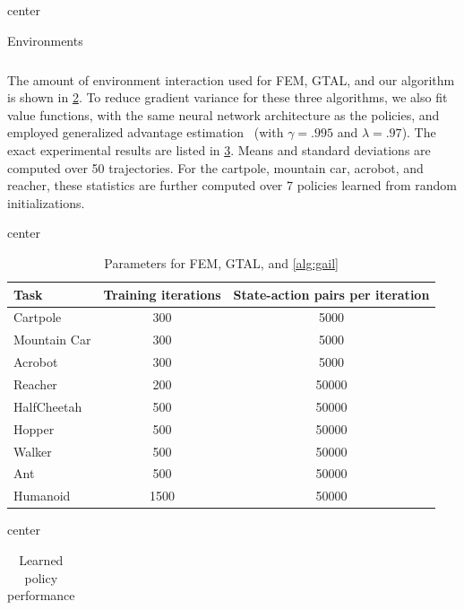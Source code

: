 \documentclass{article}
\newcommand{\1}{\mathbb{I}} %
\begin{document}
\begin{table}[h]
  \centering
  \scriptsize
  \caption{Environments}
  \label{table:envs}

  \begin{adjustbox}{center}
    \begin{tabular}{lcccc}
      \toprule
      
      \bottomrule
    \end{tabular}
  \end{adjustbox}
\end{table}

The amount of environment interaction used for FEM, GTAL, and our algorithm is shown in \cref{table:params}.
To reduce gradient variance for these three algorithms, we also fit value functions, with the same neural network architecture as the policies, and employed generalized advantage estimation~\citep{schulman2015high} (with $\gamma=.995$ and $\lambda=.97$).
The exact experimental results are listed in \cref{table:results}. Means and standard deviations are computed over 50 trajectories.
For the cartpole, mountain car, acrobot, and reacher, these statistics are further computed over 7 policies learned from random initializations.

\begin{table}[h]
  \centering
  \scriptsize
  \caption{Parameters for FEM, GTAL, and \cref{alg:gail}}
  \label{table:params}

  \begin{adjustbox}{center}
    \begin{tabular}{lcc}
      \toprule
        Task & Training iterations & State-action pairs per iteration \\
        \midrule
        Cartpole & 300 & 5000 \\
        Mountain Car & 300 & 5000 \\
        Acrobot & 300 & 5000 \\
        Reacher & 200 & 50000 \\
        HalfCheetah & 500 & 50000 \\
        Hopper & 500 & 50000 \\
        Walker & 500 & 50000 \\
        Ant & 500 & 50000 \\
        Humanoid & 1500 & 50000 \\
      \bottomrule
    \end{tabular}
  \end{adjustbox}
\end{table}

\begin{table}[b]
  \centering
  \scriptsize
  \caption{Learned policy performance}
  \label{table:results}

  \begin{adjustbox}{center}
    \begin{tabular}{lccccc}
      \toprule
      
      \midrule
      
      \bottomrule
    \end{tabular}
  \end{adjustbox}
\end{table}
\end{document}
